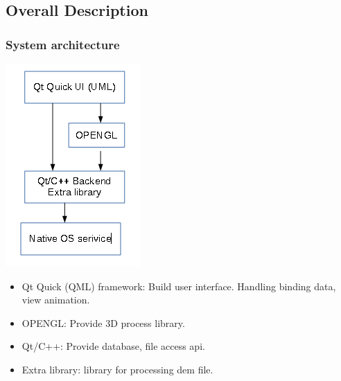 \documentclass[11pt]{article}
\begin{document}
\subsection{Overall Description}
\subsubsection{System architecture}
\includegraphics{1.png}
\begin{itemize}
\item Qt Quick (QML) framework: Build user interface. Handling binding data, view animation.
\item OPENGL: Provide 3D process library.
\item Qt/C++: Provide database, file access api.
\item Extra library: library for processing dem file.
\end{itemize}
\end{document}
